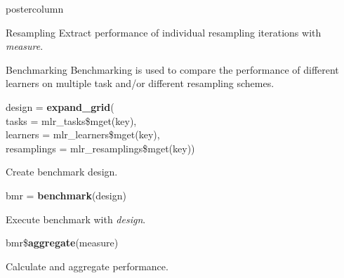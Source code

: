 \documentclass{beamer}
\begin{document}
\begin{frame}[fragile]{}
\begin{columns}
\begin{column}{.245\textwidth}
\begin{beamercolorbox}[center]{postercolumn}
\begin{minipage}{.98\textwidth}
{\begin{myblock}{Resampling}
						      Extract performance of individual resampling iterations with \textit{measure}.
					      \end{myblock}
				        \begin{myblock}{Benchmarking}
						      Benchmarking is used to compare the performance of different learners on multiple task and/or different resampling schemes.
						    \\
						      \begin{codeboxmultiline}[width=21.95cm]
							      design = \textbf{expand\_grid}(\\
							      \hspace*{1ex}tasks = mlr\_tasks\$mget(key),\\
							      \hspace*{1ex}learners = mlr\_learners\$mget(key),\\
							      \hspace*{1ex}resamplings = mlr\_resamplings\$mget(key))
						      \end{codeboxmultiline}
						      Create benchmark design.
						      \\
						      \begin{codebox}
							      bmr = \textbf{benchmark}(design)
						      \end{codebox}
						      Execute benchmark with \textit{design}.
					      	\\
						      \begin{codebox}
							      bmr\$\textbf{aggregate}(measure)
						      \end{codebox}
						      Calculate and aggregate performance.
					        \end{myblock}\vfill
				            }
		          	\end{minipage}
		          \end{beamercolorbox}
	           \end{column}
            \end{columns}
          \end{frame}
        
\end{document}
